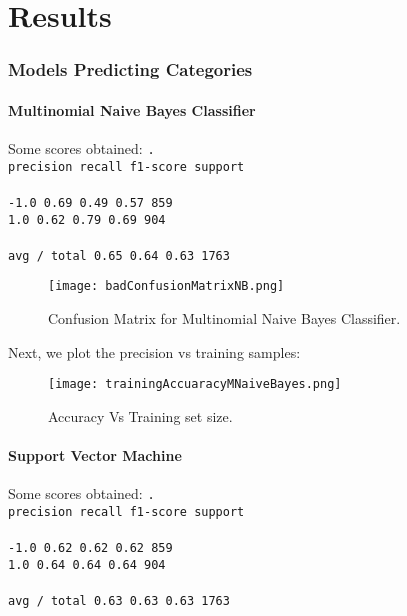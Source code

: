 
\chapter{Results}
\label{ch:results}

\subsection{Models Predicting Categories}
\subsubsection{Multinomial Naive Bayes Classifier}
Some scores obtained:
\texttt{.\\
             precision    recall  f1-score   support \\
\\
       -1.0       0.69      0.49      0.57       859\\
        1.0       0.62      0.79      0.69       904\\
\\
avg / total       0.65      0.64      0.63      1763\\
}

\begin{figure}[h]
	\label{fig:nbConfusion}
	\texttt{[image: badConfusionMatrixNB.png]}
    \caption{Confusion Matrix for Multinomial Naive Bayes Classifier.}
\end{figure}

Next, we plot the precision vs training samples:

%
\begin{figure}[h]
	\label{fig:partialResults1}
	\texttt{[image: trainingAccuaracyMNaiveBayes.png]}
    \caption{Accuracy Vs Training set size.}
\end{figure}


\subsubsection{Support Vector Machine}
Some scores obtained:
\texttt{.\\
     precision    recall  f1-score   support\\
\\
       -1.0       0.62      0.62      0.62       859\\
        1.0       0.64      0.64      0.64       904\\
\\
avg / total       0.63      0.63      0.63      1763\\
}